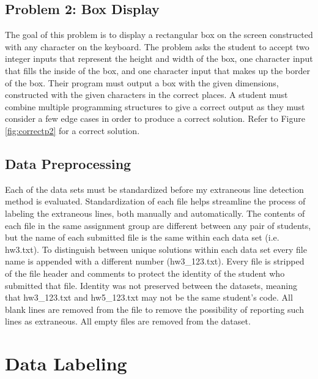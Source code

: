 \subsection{Problem 2: Box Display}
The goal of this problem is to display a rectangular box on the screen constructed with any character on the keyboard. The problem asks the student to accept two integer inputs that represent the height and width of the box, one character input that fills the inside of the box, and one character input that makes up the border of the box. Their program must output a box with the given dimensions, constructed with the given characters in the correct places. A student must combine multiple programming structures to give a correct output as they must consider a few edge cases in order to produce a correct solution. Refer to Figure \ref{fig:correctp2} for a correct solution.

\subsection{Data Preprocessing}
Each of the data sets must be standardized before my extraneous line detection method is evaluated. Standardization of each file helps streamline the process of labeling the extraneous lines, both manually and automatically. The contents of each file in the same assignment group are different between any pair of students, but the name of each submitted file is the same within each data set (i.e. hw3.txt). To distinguish between unique solutions within each data set every file name is appended with a different number (hw3\_123.txt). Every file is stripped of the file header and comments to protect the identity of the student who submitted that file. Identity was not preserved between the datasets, meaning that hw3\_123.txt and hw5\_123.txt may not be the same student's code. All blank lines are removed from the file to remove the possibility of reporting such lines as extraneous. All empty files are removed from the dataset.

\section{Data Labeling}

